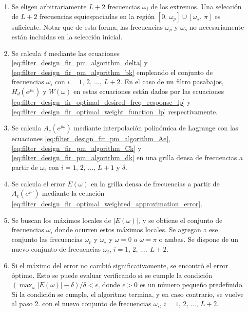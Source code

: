 \documentclass[a4paper]{report}
\begin{document}
\begin{enumerate}
 \item Se eligen arbitrariamente \(L+2\) frecuencias \(\omega_i\) de los extremos. Una selección de \(L+2\) frecuencias equiespaciadas en la región \([0,\,\omega_p]\cup[\omega_s,\,\pi]\) es suficiente. Notar que de esta forma, las frecuencias \(\omega_p\) y \(\omega_s\) no necesariamente están incluidas en la selección inicial.
 \item Se calcula \(\delta\) mediante las ecuaciones \ref{eq:filter_design_fir_pm_algorithm_delta} y \ref{eq:filter_design_fir_pm_algorithm_bk} empleando el conjunto de frecuencias \(\omega_i\) con \(i=1,\,2,\,\dots,\,L+2\). En el caso de un filtro pasabajos, \(H_d(e^{j\omega})\) y \(W(\omega)\) en estas ecuaciones están dados por las ecuaciones \ref{eq:filter_design_fir_optimal_desired_freq_response_lp} y \ref{eq:filter_design_fir_optimal_weight_function_lp} respectivamente.
 \item Se calcula \(A_e(e^{j\omega})\) mediante interpolación polinómica de Lagrange con las ecuaciones \ref{eq:filter_design_fir_pm_algorithm_Ae}, \ref{eq:filter_design_fir_pm_algorithm_Ck} y \ref{eq:filter_design_fir_pm_algorithm_dk} en una grilla densa de frecuencias a partir de \(\omega_i\) con \(i=1,\,2,\,\dots,\,L+1\) y \(\delta\).
 \item Se calcula el error \(E(\omega)\) en la grilla densa de frecuencias a partir de \(A_e(e^{j\omega})\) mediante la ecuación \ref{eq:filter_design_fir_optimal_weighted_approximation_error}.
 \item Se buscan los máximos locales de \(|E(\omega)|\), y se obtiene el conjunto de frecuencias \(\omega_i\) donde ocurren estos máximos locales. Se agregan a ese conjunto las frecuencias \(\omega_p\) y \(\omega_s\) y \(\omega=0\) o \(\omega=\pi\) o ambas. Se dispone de un nuevo conjunto de frecuencias \(\omega_i\), \(i=1,\,2,\,\dots,\,L+2\).
 \item Si el máximo del error no cambió significativamente, se encontró el error óptimo. Esto se puede evaluar verificando si se cumple la condición \((\max_\omega|E(\omega)|-\delta)/\delta<\epsilon\), donde \(\epsilon>0\) es un número pequeño predefinido. Si la condición se cumple, el algoritmo termina, y en caso contrario, se vuelve al paso 2. con el nuevo conjunto de frecuencias \(\omega_i\), \(i=1,\,2,\,\dots,\,L+2\).
\end{enumerate}
\end{document}
